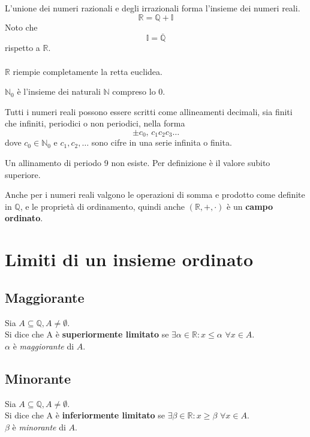 \documentclass[a4paper,12pt, oneside]{book}
\begin{document}
L'unione dei numeri razionali e degli irrazionali forma l'insieme dei numeri reali.
\begin{equation}
\mathbb{R} = \mathbb{Q} + \mathbb{I}
\end{equation}
Noto che
\begin{equation}
	\mathbb{I} = \overline{\mathbb{Q}}
\end{equation}
rispetto a $\mathbb{R}$.\\\\
$\mathbb{R}$ riempie completamente la retta euclidea.
\begin{shaded}
\begin{nota}
$\mathbb{N}_0$ è l'insieme dei naturali $\mathbb{N}$ compreso lo 0. 
\end{nota}
\end{shaded}
Tutti i numeri reali possono essere scritti come allineamenti decimali, sia finiti che infiniti, periodici o non periodici, nella forma
$$\pm c_0,\,c_1c_2c_3\dots$$
dove $c_0\in\mathbb{N}_0$ e $c_1,c_2,\dots$ sono cifre in una serie infinita o finita.
\begin{shaded}
\begin{nota}
Un allinamento di periodo 9 non esiste. Per definizione è il valore subito superiore.
\end{nota}
\end{shaded}
Anche per i numeri reali valgono le operazioni di somma e prodotto come definite in $\mathbb{Q}$, e le proprietà di ordinamento, quindi anche $(\mathbb{R},+,\cdot)$ è un \textbf{campo ordinato}.
\section{Limiti di un insieme ordinato}
\subsection{Maggiorante}
\begin{definizione}
Sia $A \subseteq \mathbb{Q}, A \neq \emptyset$.\\
Si dice che A è \textbf{superiormente limitato} se $\exists\alpha\in\mathbb{R}\colon x\leq\alpha$ $\forall x\in A$.\\
$\alpha$ è \emph{maggiorante} di $A$.
\end{definizione}
\subsection{Minorante}
\begin{definizione}
Sia $A \subseteq \mathbb{Q}, A \neq \emptyset$.\\
Si dice che A è \textbf{inferiormente limitato} se $\exists\beta\in\mathbb{R}\colon x\geq\beta$ $\forall x\in A$.\\
$\beta$ è \emph{minorante} di $A$.
\end{definizione}
\end{document}
